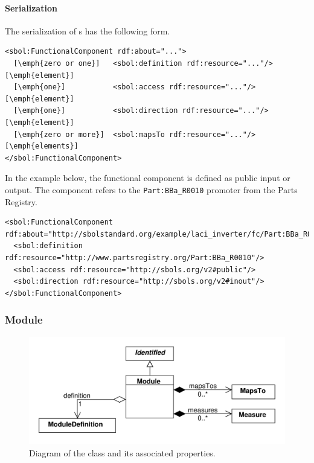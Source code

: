 \paragraph{Serialization}

The serialization of s has the following form.
\begin{lstlisting}
<sbol:FunctionalComponent rdf:about="...">
  [\emph{zero or one}]   <sbol:definition rdf:resource="..."/> [\emph{element}]
  [\emph{one}]           <sbol:access rdf:resource="..."/> [\emph{element}]
  [\emph{one}]           <sbol:direction rdf:resource="..."/> [\emph{element}]
  [\emph{zero or more}]  <sbol:mapsTo rdf:resource="..."/> [\emph{elements}]
</sbol:FunctionalComponent>
\end{lstlisting}

In the example below, the functional component is defined as public input or output. The component refers to the \texttt{Part:BBa\_R0010} promoter from the Parts Registry.
\begin{lstlisting}
<sbol:FunctionalComponent rdf:about="http://sbolstandard.org/example/laci_inverter/fc/Part:BBa_R0010">
  <sbol:definition rdf:resource="http://www.partsregistry.org/Part:BBa_R0010"/>
  <sbol:access rdf:resource="http://sbols.org/v2#public"/>
  <sbol:direction rdf:resource="http://sbols.org/v2#inout"/>
</sbol:FunctionalComponent>
\end{lstlisting}

\subsubsection{Module}
\label{sec:Module}

\begin{figure}[ht]
\begin{center}
\includegraphics[scale=0.6]{uml/module}
\caption[]{Diagram of the  class and its associated properties.}
\label{uml:module}
\end{center}
\end{figure}

